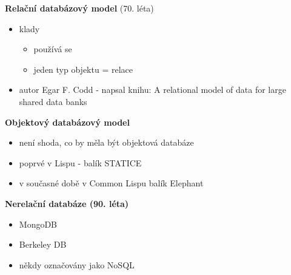 \documentclass[10pt, a4paper, titlepage]{article}
\theoremstyle{note}
\begin{document}
\textbf{Relační databázový model} (70. léta)
\begin{itemize}
	\item klady
	\begin{itemize}
		\item používá se
		\item jeden typ objektu = relace
	\end{itemize}
	\item autor Egar F. Codd - napsal knihu:  A relational model of data for large shared data banks
\end{itemize}

\textbf{Objektový databázový model}
\begin{itemize}
	\item není shoda, co by měla být objektová databáze
	\item poprvé v Lispu - balík STATICE
	\item v současné době v Common Lispu balík Elephant
\end{itemize}

\textbf{Nerelační databáze (90. léta)}
\begin{itemize}
	\item MongoDB
	\item Berkeley DB
	\item někdy označovány jako NoSQL
\end{itemize}

\renewcommand{\indexcolumns}{3}
\printindex
\end{document}
